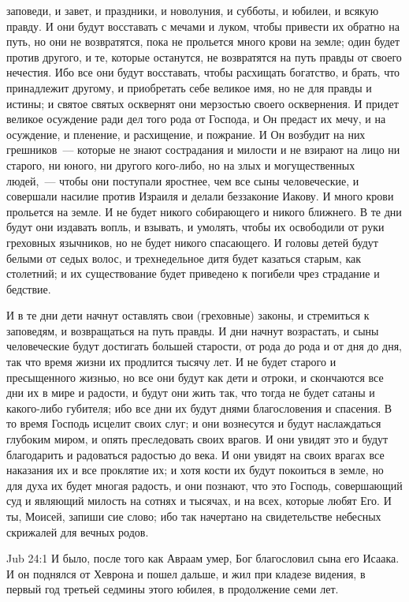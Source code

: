 заповеди, и завет, и праздники, и новолуния, и
субботы, и юбилеи, и всякую правду. И они будут
восставать с мечами и луком, чтобы привести их
обратно на путь, но они не возвратятся, пока не
прольется много крови на земле; один будет против
другого, и те, которые останутся, не возвратятся
на путь правды от своего нечестия. Ибо все они
будут восставать, чтобы расхищать богатство, и
брать, что принадлежит другому, и приобретать
себе великое имя, но не для правды и истины; и
святое святых осквернят они мерзостью своего
осквернения. И придет великое осуждение ради дел
того рода от Господа, и Он предаст их мечу, и на
осуждение, и пленение, и расхищение, и пожрание. И
Он возбудит на них грешников~--- которые не знают
сострадания и милости и не взирают на лицо ни
старого, ни юного, ни другого кого-либо, но на злых
и могущественных людей,~--- чтобы они поступали
яростнее, чем все сыны человеческие, и совершали
насилие против Израиля и делали беззаконие
Иакову. И много крови прольется на земле. И не
будет никого собирающего и никого ближнего. В те
дни будут они издавать вопль, и взывать, и
умолять, чтобы их освободили от руки греховных
язычников, но не будет никого спасающего. И
головы детей будут белыми от седых волос, и
трехнедельное дитя будет казаться старым, как
столетний; и их существование будет приведено к
погибели чрез страдание и бедствие.

И в те дни дети начнут оставлять свои
(греховные) законы, и стремиться к заповедям, и
возвращаться на путь правды. И дни начнут
возрастать, и сыны человеческие будут достигать
большей старости, от рода до рода и от дня до дня,
так что время жизни их продлится тысячу лет. И не
будет старого и пресыщенного жизнью, но все они
будут как дети и отроки, и скончаются все дни их в
мире и радости, и будут они жить так, что тогда не
будет сатаны и какого-либо губителя; ибо все дни
их будут днями благословения и спасения. В то
время Господь исцелит своих слуг; и они
вознесутся и будут наслаждаться глубоким миром,
и опять преследовать своих врагов. И они увидят
это и будут благодарить и радоваться радостью до
века. И они увидят на своих врагах все наказания
их и все проклятие их; и хотя кости их будут
покоиться в земле, но для духа их будет многая
радость, и они познают, что это Господь,
совершающий суд и являющий милость на сотнях и
тысячах, и на всех, которые любят Его. И ты, Моисей,
запиши сие слово; ибо так начертано на
свидетельстве небесных скрижалей для вечных
родов.

\vs Jub 24:1
И было, после того как Авраам умер, Бог
благословил сына его Исаака. И он поднялся от
Хеврона и пошел дальше, и жил при кладезе видения,
в первый год третьей седмины этого юбилея, в
продолжение семи лет.

